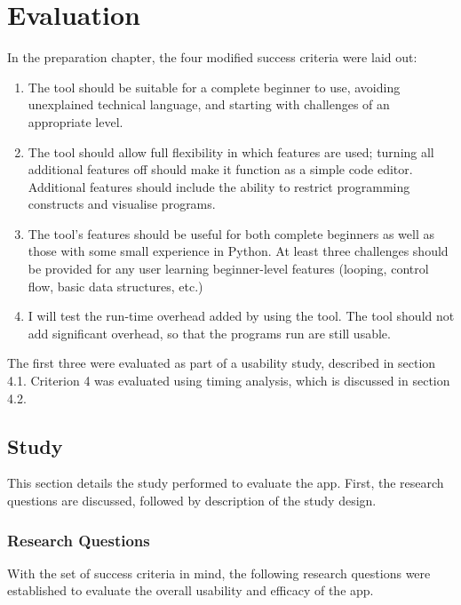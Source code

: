 \chapter{Evaluation}

In the preparation chapter, the four modified success criteria were laid out:

\begin{enumerate}
    \item The tool should be suitable for a complete beginner to use, avoiding unexplained technical language, and starting with challenges of an appropriate level.

    \item The tool should allow full flexibility in which features are used; turning all additional features off should make it function as a simple code editor. Additional features should include the ability to restrict programming constructs and visualise programs.

    \item The tool’s features should be useful for both complete beginners as well as those with some small experience in Python. At least three challenges should be provided for any user learning beginner-level features (looping, control flow, basic data structures, etc.)

    \item I will test the run-time overhead added by using the tool. The tool should not add significant overhead, so that the programs run are still usable.
\end{enumerate}

The first three were evaluated as part of a usability study, described in section 4.1. Criterion 4 was evaluated using timing analysis, which is discussed in section 4.2.

\section{Study}

This section details the study performed to evaluate the app. First, the research questions are discussed, followed by description of the study design.

\subsection{Research Questions}

With the set of success criteria in mind, the following research questions were established to evaluate the overall usability and efficacy of the app.

